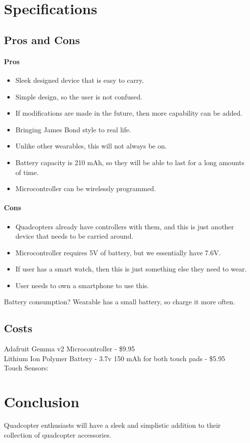 \documentclass[12pt,letterpaper]{article}
\begin{document}
\section*{Specifications}

\subsection*{Pros and Cons}

\paragraph{Pros}
\begin{itemize}
	\item Sleek designed device that is easy to carry.
	\item Simple design, so the user is not confused.
	\item If modifications are made in the future, then more capability can be added.
	\item Bringing James Bond style to real life.
	\item Unlike other wearables, this will not always be on.
	\item Battery capacity is 210 mAh, so they will be able to last for a long amounts of time.
	\item Microcontroller can be wirelessly programmed.
\end{itemize}

\paragraph{Cons}
\begin{itemize}
	\item Quadcopters already have controllers with them, and this is just another device that needs to be carried around.
	\item Microcontroller requires 5V of battery, but we essentially have 7.6V.
	\item If user has a smart watch, then this is just something else they need to wear.
	\item User needs to own a smartphone to use this.
\end{itemize}

Battery consumption?
Wearable has a small battery, so charge it more often.
\subsection*{Costs}
Adafruit Gemma v2 Microcontroller - \$9.95 \\
Lithium Ion Polymer Battery - 3.7v 150 mAh for both touch pads - \$5.95 \\
Touch Sensors: \\



\section*{Conclusion}
Quadcopter enthusiasts will have a sleek and simplistic addition to their collection of quadcopter accessories. 

\newpage
\nocite{*}


\end{document}
